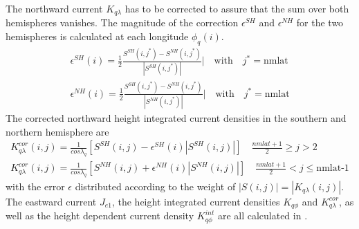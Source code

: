%
The northward current $K_{q \lambda}$ has to be corrected to assure that the sum over
both hemispheres vanishes.  The magnitude of the correction $\epsilon^{SH}$ and
$\epsilon^{NH}$ for the two hemispheres is calculated at each longitude $\phi_q(i)$.
%
\begin{align}
   \epsilon^{SH}(i) = \frac{1}{2} \frac{S^{SH}(i,j^*) - S^{NH}(i,j^*)}{|S^{SH}(i,j^*)|}  | \quad 
   \text{with} \quad j^* = \text{nmlat}\label{eq:kqlam_epsilon_sh} \\
   \epsilon^{NH}(i) = \frac{1}{2} \frac{S^{SH}(i,j^*) - S^{NH}(i,j^*)}{|S^{NH}(i,j^*)|}  | \quad 
   \text{with} \quad j^* = \text{nmlat}\label{eq:kqlam_epsilon_nh} 
\end{align}
%
The corrected northward height integrated current densities in the southern and northern 
hemisphere are
%
\begin{align}
   K_{q \lambda}^{cor}(i,j) = \frac{1}{cos \lambda_q} [S^{SH}(i,j) - \epsilon^{SH}(i)
   |S^{SH}(i,j)|]\label{eq:kqlam_cor sh}
    \quad  \frac{nmlat+1}{2}\ge j > 2 \\
   K_{q \lambda}^{cor}(i,j) = \frac{1}{cos \lambda_q} [S^{NH}(i,j) + \epsilon^{NH}(i)
   |S^{NH}(i,j)|]
    \quad \frac{nmlat+1}{2} < j \le \text{nmlat-1} \label{eq:kqlam_cor nh} 
\end{align}
%
with the error $\epsilon$ distributed according to the weight of $|S(i,j)|= 
|K_{q \lambda}(i,j)|$. The eastward current $J_{e1}$, the height integrated
current densities $K_{q \phi}$ and $K_{q \lambda}^{cor}$, as well as the height
dependent current density $K_{q \phi}^{int}$ are all calculated in 
.
